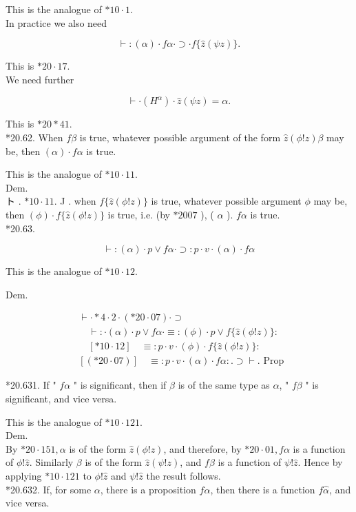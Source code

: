 \documentclass[10pt]{article}
\begin{document}
This is the analogue of $* 10 \cdot 1$.\\
In practice we also need

$$
\vdash:(\alpha) \cdot f \alpha \cdot \supset \cdot f\{\hat{z}(\psi z)\} .
$$

This is $* 20 \cdot 17$.\\
We need further

$$
\vdash \cdot\left(H^{\alpha}\right) \cdot \hat{z}(\psi z)=\alpha .
$$

This is $* 20 * 41$.\\
*20.62. When $f \beta$ is true, whatever possible argument of the form $\hat{z}(\phi!z) \beta$ may be, then $(\alpha) \cdot f \alpha$ is true.

This is the analogue of $* 10 \cdot 11$.\\
Dem.\\
ト . $* 10 \cdot 11$. J . when $f\{\hat{z}(\phi!z)\}$ is true, whatever possible argument $\phi$ may be, then $(\phi) \cdot f\{\hat{z}(\phi!z)\}$ is true, i.e. (by $* 2007$ ), ( $\alpha$ ). $f \alpha$ is true.\\
*20.63.

$$
\vdash:(\alpha) \cdot p \vee f \alpha \cdot \supset: p \cdot v \cdot(\alpha) \cdot f \alpha
$$

This is the analogue of $* 10 \cdot 12$.

Dem.

$$
\begin{aligned}
& \vdash \cdot * 4 \cdot 2 \cdot(* 20 \cdot 07) \cdot \supset \\
& \quad \vdash: \cdot(\alpha) \cdot p \vee f \alpha \cdot \equiv:(\phi) \cdot p \vee f\{\hat{z}(\phi!z)\}: \\
& \quad[* 10 \cdot 12] \quad \equiv: p \cdot v \cdot(\phi) \cdot f\{\hat{z}(\phi!z)\}: \\
& {[(* 20 \cdot 07)] \quad \equiv: p \cdot v \cdot(\alpha) \cdot f \alpha: . \supset \vdash . \text { Prop }}
\end{aligned}
$$

*20.631. If " $f \alpha$ " is significant, then if $\beta$ is of the same type as $\alpha$, " $f \beta$ " is significant, and vice versa.

This is the analogue of $* 10 \cdot 121$.\\
Dem.\\
By $* 20 \cdot 151, \alpha$ is of the form $\hat{z}(\phi!z)$, and therefore, by $* 20 \cdot 01, f \alpha$ is a function of $\phi!\hat{z}$. Similarly $\beta$ is of the form $\hat{z}(\psi!z)$, and $f \beta$ is a function of $\psi!\hat{z}$. Hence by applying $* 10 \cdot 121$ to $\phi!\hat{z}$ and $\psi!\hat{z}$ the result follows.\\
*20.632. If, for some $\alpha$, there is a proposition $f \alpha$, then there is a function $f \hat{\alpha}$, and vice versa.
\end{document}
